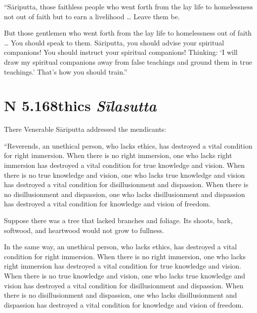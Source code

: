 \documentclass[12pt,openany]{book}%
\newcommand*{\suttatitleacronym}[1]{\smaller[2]{#1}\vspace*{.3em}}
\newcommand*{\suttatitletranslation}[1]{\linebreak{#1}}
\newcommand*{\suttatitleroot}[1]{\linebreak\smaller[2]\itshape{#1}}
\newcommand*{\tocacronym}[1]{\hspace*{-3.3em}{#1}\quad}
\newcommand*{\toctranslation}[1]{#1}
\newcommand*{\tocroot}[1]{(\textit{#1})}
\begin{document}
“\textsanskrit{Sāriputta}, those faithless people who went forth from the lay life to homelessness not out of faith but to earn a livelihood … Leave them be. 

But those gentlemen who went forth from the lay life to homelessness out of faith … You should speak to them. \textsanskrit{Sāriputta}, you should advise your spiritual companions! You should instruct your spiritual companions! Thinking: ‘I will draw my spiritual companions away from false teachings and ground them in true teachings.’ That’s how you should train.” 

%
\section*{{\suttatitleacronym AN 5.168}{\suttatitletranslation Ethics }{\suttatitleroot Sīlasutta}}
\addcontentsline{toc}{section}{\tocacronym{AN 5.168} \toctranslation{Ethics } \tocroot{Sīlasutta}}

There Venerable \textsanskrit{Sāriputta} addressed the mendicants: 

“Reverends, an unethical person, who lacks ethics, has destroyed a vital condition for right immersion. When there is no right immersion, one who lacks right immersion has destroyed a vital condition for true knowledge and vision. When there is no true knowledge and vision, one who lacks true knowledge and vision has destroyed a vital condition for disillusionment and dispassion. When there is no disillusionment and dispassion, one who lacks disillusionment and dispassion has destroyed a vital condition for knowledge and vision of freedom. 

Suppose there was a tree that lacked branches and foliage. Its shoots, bark, softwood, and heartwood would not grow to fullness. 

In the same way, an unethical person, who lacks ethics, has destroyed a vital condition for right immersion. When there is no right immersion, one who lacks right immersion has destroyed a vital condition for true knowledge and vision. When there is no true knowledge and vision, one who lacks true knowledge and vision has destroyed a vital condition for disillusionment and dispassion. When there is no disillusionment and dispassion, one who lacks disillusionment and dispassion has destroyed a vital condition for knowledge and vision of freedom. 
\end{document}
